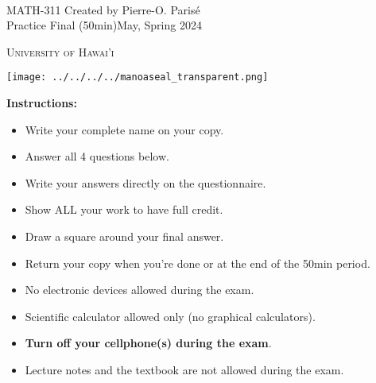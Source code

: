 \documentclass[addpoints, 12pt]{exam}%
\theoremstyle{definition}
\begin{document}
	\noindent \hrulefill \\
	\noindent MATH-311 \hfill Created by Pierre-O. Paris{\'e}\\
	Practice Final (50min)\hfill May, Spring 2024\\\vspace*{-0.7cm}

\noindent\hrulefill

\vspace*{0.5cm}

\begin{center}
\begin{minipage}{0.6\textwidth}
\begin{Huge}
\textsc{University of Hawai'i}
\end{Huge}
\end{minipage}
\begin{minipage}{0.12\textwidth}
\texttt{[image: ../../../../manoaseal\_transparent.png]}
\end{minipage}
\end{center}
	
\vspace*{0.5cm}

\noindent{}

\vspace*{0.5cm}

\noindent{}

\vspace*{1cm}

\begin{center}
\gradetable[h][questions]
\end{center}

\vspace*{1cm}

\noindent\textbf{Instructions:} 

\begin{itemize}
\item Write your complete name on your copy. 
\item Answer all 4 questions below.
\item Write your answers directly on the questionnaire.
\item Show ALL your work to have full credit.
\item Draw a square around your final answer.
\item Return your copy when you're done or at the end of the 50min period. 
\item No electronic devices allowed during the exam. 
\item Scientific calculator allowed only (no graphical calculators).
\item \textbf{Turn off your cellphone(s) during the exam}.
\item Lecture notes and the textbook are not allowed during the exam. 
\end{itemize}
\end{document}
